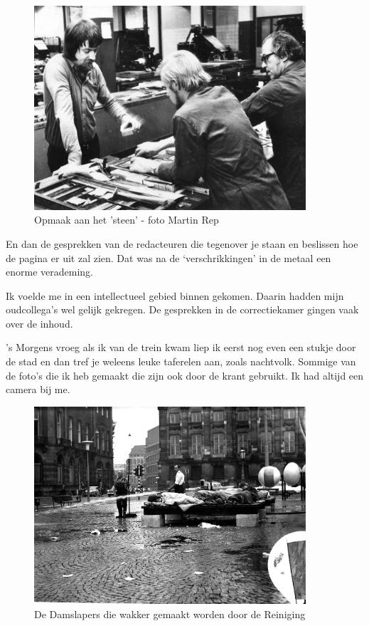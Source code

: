 \documentclass[12pt,twoside, openright]{memoir}
\begin{document}
\begin{figure}
\centering
\includegraphics[width=0.9\textwidth]{img/232opmaak.JPG}
\caption*{\footnotesize Opmaak aan het 'steen' - foto Martin Rep}
\end{figure}

En dan de gesprekken van de redacteuren die tegenover je staan en beslissen hoe de pagina er uit zal zien. Dat was na de `verschrikkingen' in de metaal een enorme verademing.

Ik voelde me in een intellectueel gebied binnen gekomen. Daarin hadden mijn oudcollega’s wel gelijk gekregen. De gesprekken in de correctiekamer gingen vaak over de inhoud. 

’s Morgens vroeg als ik van de trein kwam liep ik eerst nog even een stukje door de stad en dan tref je weleens leuke taferelen aan, zoals nachtvolk. Sommige van de foto’s die ik heb gemaakt die zijn ook door de krant gebruikt. Ik had altijd een camera bij me.

\begin{figure}
\centering
\includegraphics[width=0.9\textwidth]{img/233damslapers.png}
\caption*{\footnotesize De Damslapers die wakker gemaakt worden door de Reiniging}
\end{figure}
\end{document}
